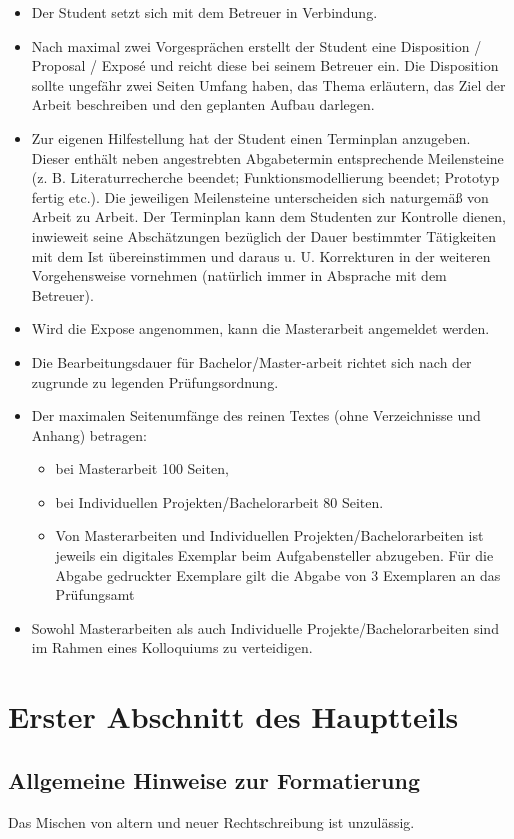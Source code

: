 \documentclass[11pt]{scrartcl}
\begin{document}
\begin{itemize}
  \item Der Student setzt sich mit dem Betreuer in Verbindung.
  \item Nach maximal zwei Vorgesprächen erstellt der Student eine Disposition / Proposal / Exposé und reicht diese bei seinem Betreuer ein. Die Disposition sollte ungefähr zwei Seiten Umfang haben, das Thema erläutern, das Ziel der Arbeit beschreiben und den geplanten Aufbau darlegen.
  \item Zur eigenen Hilfestellung hat der Student einen Terminplan anzugeben. Dieser enthält neben angestrebten Abgabetermin entsprechende Meilensteine (z. B. Literaturrecherche beendet; Funktionsmodellierung beendet; Prototyp fertig etc.). Die jeweiligen Meilensteine unterscheiden sich naturgemäß von Arbeit zu Arbeit. Der Terminplan kann dem Studenten zur Kontrolle dienen, inwieweit seine Abschätzungen bezüglich der Dauer bestimmter Tätigkeiten mit dem Ist übereinstimmen und daraus u. U. Korrekturen in der weiteren Vorgehensweise vornehmen (natürlich immer in Absprache mit dem Betreuer).
  \item Wird die Expose angenommen, kann die Masterarbeit angemeldet werden.
  \item Die Bearbeitungsdauer für Bachelor/Master-arbeit  richtet sich nach der zugrunde zu legenden Prüfungsordnung.
  \item Der maximalen Seitenumfänge des reinen Textes (ohne Verzeichnisse und Anhang) betragen:
  \begin{itemize}
    \item bei Masterarbeit 100 Seiten,
    \item bei Individuellen Projekten/Bachelorarbeit 80 Seiten.
    \item Von Masterarbeiten und Individuellen Projekten/Bachelorarbeiten ist jeweils ein digitales Exemplar beim Aufgabensteller abzugeben. Für die Abgabe gedruckter Exemplare gilt die Abgabe von 3 Exemplaren an das Prüfungsamt
  \end{itemize}
  \item Sowohl Masterarbeiten als auch Individuelle Projekte/Bachelorarbeiten sind im Rahmen eines Kolloquiums zu verteidigen.
\end{itemize}
  

\section{Erster Abschnitt des Hauptteils}
\subsection{Allgemeine Hinweise zur Formatierung}
Das Mischen von altern und neuer Rechtschreibung ist unzulässig. 
\end{document}
